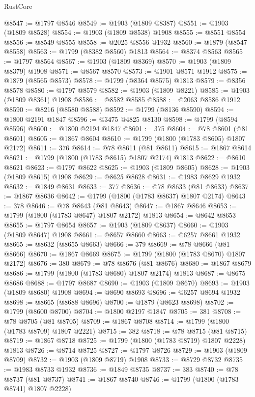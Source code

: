\begin{lexlean}{RustCore}
\begin{coremodule}
@8547 := @1797 @8546
@8549 := @1903 (@1809 @8387)
@8551 := @1903 (@1809 @8528)
@8554 := @1903 (@1809 @8538) @1908
@8555 := @8551 @8554
@8556 := @8549 @8555
@8558 := @2025 @8556 @1932
@8560 := @1879 (@8547 @8558)
@8563 := @1799 (@8382 @8560) @1813
@8564 := @8374 @8563
@8565 := @1797 @8564
@8567 := @1903 (@1809 @8369)
@8570 := @1903 (@1809 @8379) @1908
@8571 := @8567 @8570
@8573 := @1901 @8571 @1912
@8575 := @1879 (@8565 @8573)
@8578 := @1799 (@8364 @8575) @1813
@8579 := @8356 @8578
@8580 := @1797 @8579
@8582 := @1903 (@1809 @8221)
@8585 := @1903 (@1809 @8361) @1908
@8586 := @8582 @8585
@8588 := @2063 @8586 @1912
@8590 := @8216 (@8580 @8588)
@8592 := @1799 (@8136 @8590)
@8594 := @1800 @2191 @1847
@8596 := @3475 @4825 @8130
@8598 := @1799 (@8594 @8596)
@8600 := @1800 @2194 @1847
@8601 := 375
@8604 := @78 @8601 (@81 @8601)
@8605 := @1867 @8604
@8610 := @1799 (@1800 (@1783 @8605) @1807 @2172)
@8611 := 376
@8614 := @78 @8611 (@81 @8611)
@8615 := @1867 @8614
@8621 := @1799 (@1800 (@1783 @8615) @1807 @2174) @1813
@8622 := @8610 @8621
@8623 := @1797 @8622
@8625 := @1903 (@1809 @8605)
@8628 := @1903 (@1809 @8615) @1908
@8629 := @8625 @8628
@8631 := @1983 @8629 @1932
@8632 := @1849 @8631
@8633 := 377
@8636 := @78 @8633 (@81 @8633)
@8637 := @1867 @8636
@8642 := @1799 (@1800 (@1783 @8637) @1807 @2174)
@8643 := 378
@8646 := @78 @8643 (@81 @8643)
@8647 := @1867 @8646
@8653 := @1799 (@1800 (@1783 @8647) @1807 @2172) @1813
@8654 := @8642 @8653
@8655 := @1797 @8654
@8657 := @1903 (@1809 @8637)
@8660 := @1903 (@1809 @8647) @1908
@8661 := @8657 @8660
@8663 := @6257 @8661 @1932
@8665 := @8632 (@8655 @8663)
@8666 := 379
@8669 := @78 @8666 (@81 @8666)
@8670 := @1867 @8669
@8675 := @1799 (@1800 (@1783 @8670) @1807 @2172)
@8676 := 380
@8679 := @78 @8676 (@81 @8676)
@8680 := @1867 @8679
@8686 := @1799 (@1800 (@1783 @8680) @1807 @2174) @1813
@8687 := @8675 @8686
@8688 := @1797 @8687
@8690 := @1903 (@1809 @8670)
@8693 := @1903 (@1809 @8680) @1908
@8694 := @8690 @8693
@8696 := @6257 @8694 @1932
@8698 := @8665 (@8688 @8696)
@8700 := @1879 (@8623 @8698)
@8702 := @1799 (@8600 @8700)
@8704 := @1800 @2197 @1847
@8705 := 381
@8708 := @78 @8705 (@81 @8705)
@8709 := @1867 @8708
@8714 := @1799 (@1800 (@1783 @8709) @1807 @2221)
@8715 := 382
@8718 := @78 @8715 (@81 @8715)
@8719 := @1867 @8718
@8725 := @1799 (@1800 (@1783 @8719) @1807 @2228) @1813
@8726 := @8714 @8725
@8727 := @1797 @8726
@8729 := @1903 (@1809 @8709)
@8732 := @1903 (@1809 @8719) @1908
@8733 := @8729 @8732
@8735 := @1983 @8733 @1932
@8736 := @1849 @8735
@8737 := 383
@8740 := @78 @8737 (@81 @8737)
@8741 := @1867 @8740
@8746 := @1799 (@1800 (@1783 @8741) @1807 @2228)

\end{coremodule}
\end{lexlean}
